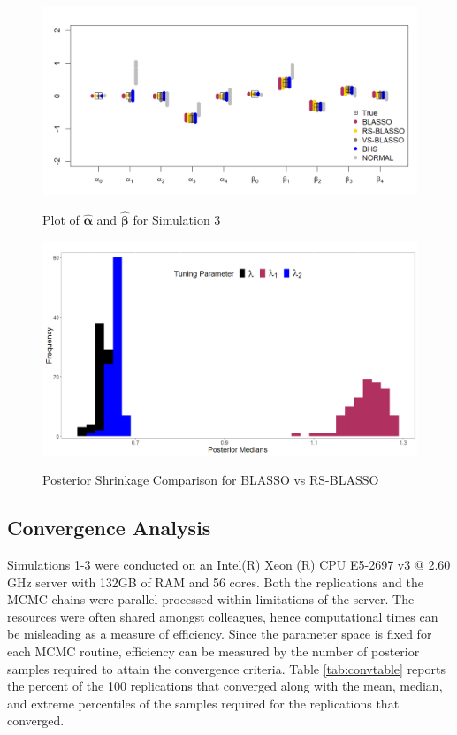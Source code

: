 \begin{figure}[!h]
	\centering
	      \caption{Plot of $\hat{\bm{\alpha}}$ and $\hat{\bm{\beta}}$ for Simulation 3}
      \includegraphics[scale=0.35]{blassovsbhs4}
      \label{fig:blvsbh4}
\end{figure}

\begin{figure}[!h]
	\centering
	      \caption{Posterior Shrinkage Comparison for BLASSO vs RS-BLASSO}
      \includegraphics[scale=0.30]{rslambda}
      \label{fig:lambdabox}
\end{figure}

\vskip 3mm

\subsection{Convergence Analysis}

Simulations 1-3 were conducted on an Intel(R) Xeon (R) CPU E5-2697 v3 @ 2.60 GHz server with 132GB of RAM and 56 cores. Both the replications and the MCMC chains were parallel-processed within limitations of the server. The resources were often shared amongst colleagues, hence computational times can be misleading as a measure of efficiency. Since the parameter space is fixed for each MCMC routine, efficiency can be measured by the number of posterior samples required to attain the convergence criteria. Table \ref{tab:convtable} reports the percent of the 100 replications that converged along with the mean, median, and extreme percentiles of the samples required for the replications that converged.

